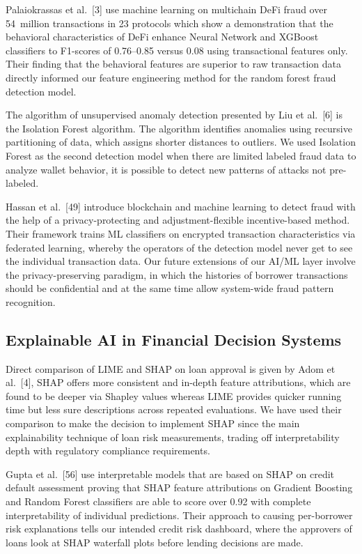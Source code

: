 \documentclass[12pt,a4paper]{report}
\begin{document}
Palaiokrassas et al.~[3] use machine learning on multichain DeFi fraud over 54~million transactions in 23 protocols which show a demonstration that the behavioral characteristics of DeFi enhance Neural Network and XGBoost classifiers to F1-scores of 0.76--0.85 versus 0.08 using transactional features only. Their finding that the behavioral features are superior to raw transaction data directly informed our feature engineering method for the random forest fraud detection model.

The algorithm of unsupervised anomaly detection presented by Liu et al.~[6] is the Isolation Forest algorithm. The algorithm identifies anomalies using recursive partitioning of data, which assigns shorter distances to outliers. We used Isolation Forest as the second detection model when there are limited labeled fraud data to analyze wallet behavior, it is possible to detect new patterns of attacks not pre-labeled.

Hassan et al.~[49] introduce blockchain and machine learning to detect fraud with the help of a privacy-protecting and adjustment-flexible incentive-based method. Their framework trains ML classifiers on encrypted transaction characteristics via federated learning, whereby the operators of the detection model never get to see the individual transaction data. Our future extensions of our AI/ML layer involve the privacy-preserving paradigm, in which the histories of borrower transactions should be confidential and at the same time allow system-wide fraud pattern recognition.

\subsection{Explainable AI in Financial Decision Systems}

Direct comparison of LIME and SHAP on loan approval is given by Adom et al.~[4], SHAP offers more consistent and in-depth feature attributions, which are found to be deeper via Shapley values whereas LIME provides quicker running time but less sure descriptions across repeated evaluations. We have used their comparison to make the decision to implement SHAP since the main explainability technique of loan risk measurements, trading off interpretability depth with regulatory compliance requirements.

Gupta et al.~[56] use interpretable models that are based on SHAP on credit default assessment proving that SHAP feature attributions on Gradient Boosting and Random Forest classifiers are able to score over 0.92 with complete interpretability of individual predictions. Their approach to causing per-borrower risk explanations tells our intended credit risk dashboard, where the approvers of loans look at SHAP waterfall plots before lending decisions are made.
\end{document}
